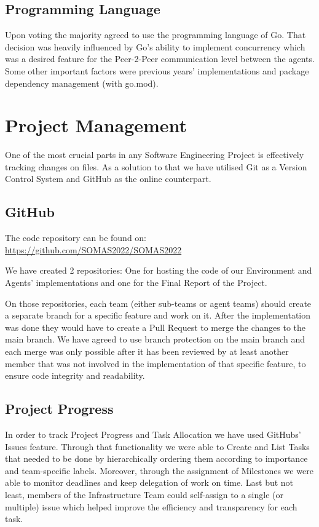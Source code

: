 \subsection{Programming Language}

Upon voting the majority agreed to use the programming language of Go. That decision was heavily influenced by Go's ability to implement concurrency which was a desired feature for the Peer-2-Peer communication level between the agents. Some other important factors were previous years' implementations and package dependency management (with go.mod).

\newpage

\section{Project Management}

One of the most crucial parts in any Software Engineering Project is effectively tracking changes on files. As a solution to that we have utilised Git as a Version Control System and GitHub as the online counterpart.

\subsection{GitHub}

The code repository can be found on: \url{https://github.com/SOMAS2022/SOMAS2022}

We have created 2 repositories: One for hosting the code of our Environment and Agents' implementations and one for the Final Report of the Project.

On those repositories, each team (either sub-teams or agent teams) should create a separate branch for a specific feature and work on it. After the implementation was done they would have to create a Pull Request to merge the changes to the main branch. We have agreed to use branch protection on the main branch and each merge was only possible after it has been reviewed by at least another member that was not involved in the implementation of that specific feature, to ensure code integrity and readability.

\subsection{Project Progress}

In order to track Project Progress and Task Allocation we have used GitHubs' Issues feature. 
Through that functionality we were able to Create and List Tasks that needed to be done by hierarchically ordering them according to importance and team-specific labels.
Moreover, through the assignment of Milestones we were able to monitor deadlines and keep delegation of work on time.
Last but not least, members of the Infrastructure Team could self-assign to a single (or multiple) issue which helped improve the efficiency and transparency for each task.

